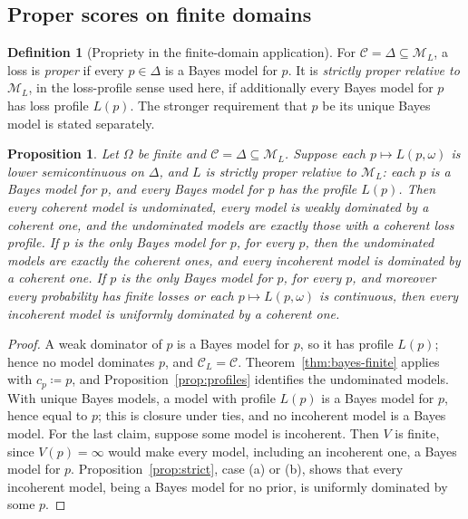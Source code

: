 \documentclass[11pt]{article}
\newtheorem{proposition}[theorem]{Proposition}
\theoremstyle{definition}
\newtheorem{definition}[theorem]{Definition}
\theoremstyle{remark}
\newcommand{\M}{\mathcal M}
\newcommand{\C}{\mathcal C}
\begin{document}
\subsection{Proper scores on finite domains}\label{sec:proper}
\begin{definition}[Propriety in the finite-domain application]\label{def:propriety}
For $\C=\Delta\subseteq\M_L$, a loss is \emph{proper} if every $p\in\Delta$ is a
Bayes model for $p$. It is \emph{strictly proper relative to $\M_L$}, in the
loss-profile sense used here, if additionally every Bayes model for $p$ has loss profile
$L(p)$. The stronger requirement that $p$ be its unique Bayes model is stated separately.
\end{definition}

\begin{proposition}\label{prop:proper}
Let $\Omega$ be finite and $\C=\Delta\subseteq\M_L$. Suppose each $p\mapsto L(p,\omega)$ is lower semicontinuous on $\Delta$, and $L$ is \emph{strictly proper relative to $\M_L$}: each $p$ is a Bayes model for $p$, and every Bayes model for $p$ has the profile $L(p)$. Then every coherent model is undominated, every model is weakly dominated by a coherent one, and the undominated models are exactly those with a coherent loss profile. If $p$ is the only Bayes model for $p$, for every $p$, then the undominated models are exactly the coherent ones, and every incoherent model is dominated by a coherent one. If $p$ is the only Bayes model for $p$, for every $p$, and moreover every probability has finite losses or each $p\mapsto L(p,\omega)$ is continuous, then every incoherent model is uniformly dominated by a coherent one.
\end{proposition}
\begin{proof}
A weak dominator of $p$ is a Bayes model for $p$, so it has profile $L(p)$; hence no model dominates $p$, and $\C_L=\C$. Theorem~\ref{thm:bayes-finite} applies with $c_p\coloneqq p$, and Proposition~\ref{prop:profiles} identifies the undominated models. With unique Bayes models, a model with profile $L(p)$ is a Bayes model for $p$, hence equal to $p$; this is closure under ties, and no incoherent model is a Bayes model. For the last claim, suppose some model is incoherent. Then $V$ is finite, since $V(p)=\infty$ would make every model, including an incoherent one, a Bayes model for $p$. Proposition~\ref{prop:strict}, case (a) or (b), shows that every incoherent model, being a Bayes model for no prior, is uniformly dominated by some $p$.
\end{proof}
\end{document}
